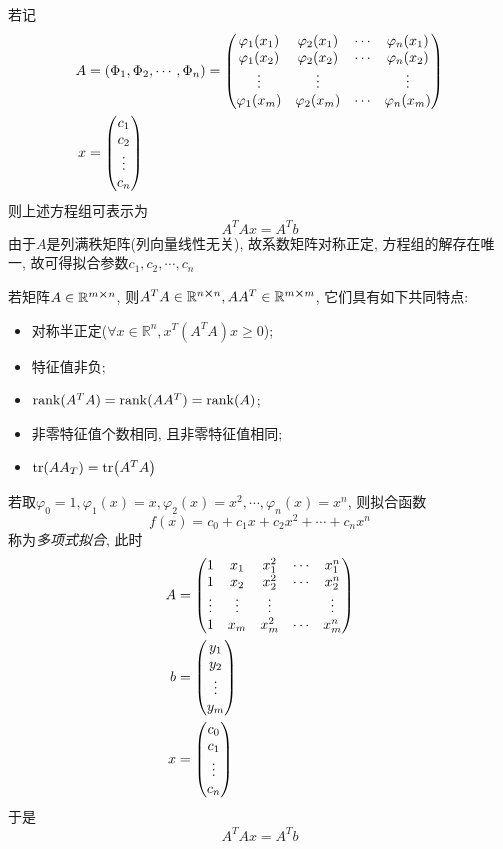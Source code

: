 若记
\begin{align*}
    A&=(\Phi_1,\Phi_2,\cdots,\Phi_n)=\mqty(
        \varphi_1(x_1)&\varphi_2(x_1)&\cdots&\varphi_n(x_1)\\
        \varphi_1(x_2)&\varphi_2(x_2)&\cdots&\varphi_n(x_2)\\
        \vdots&\vdots& &\vdots\\
        \varphi_1(x_m)&\varphi_2(x_m)&\cdots&\varphi_n(x_m)\\
    )\\
    x&=\mqty(
        c_1\\c_2\\\vdots\\c_n
    )
\end{align*}
则上述方程组可表示为
\begin{equation*}
    A^TAx=A^Tb
\end{equation*}
由于$A$是列满秩矩阵(列向量线性无关), 故系数矩阵对称正定, 方程组的解存在唯一, 故可得拟合参数$c_1,c_2,\cdots,c_n$

\begin{extend}
    若矩阵$A\in\mathbb{R}^{m\cross n}$, 则$A^TA\in\mathbb{R}^{n\cross n}, AA^T\in\mathbb{R}^{m\cross m}$, 它们具有如下共同特点:
    
    \begin{itemize}
        \item 对称半正定($\forall x\in\mathbb{R}^n, x^T(A^TA)x\ge 0$);
        \item 特征值非负;
        \item $\rank(A^TA)=\rank(AA^T)=\rank(A)$;
        \item 非零特征值个数相同, 且非零特征值相同;
        \item $\tr(AA_T)=\tr(A^TA)$
    \end{itemize}
\end{extend}

若取$\varphi_0=1,\varphi_1(x)=x,\varphi_2(x)=x^2,\cdots,\varphi_n(x)=x^n$, 则拟合函数
\begin{equation*}
    f(x)=c_0+c_1x+c_2x^2+\cdots+c_nx^n
\end{equation*}
称为\emph{多项式拟合}, 此时
\begin{align*}
    A&=\mqty(
        1&x_1&x_1^2&\cdots&x_1^n\\
        1&x_2&x_2^2&\cdots&x_2^n\\
        \vdots&\vdots&\vdots& &\vdots\\
        1&x_m&x_m^2&\cdots&x_m^n\\
    )\\
    b&=\mqty(y_1\\y_2\\\vdots\\y_m)\\
    x&=\mqty(c_0\\c_1\\\vdots\\c_n)
\end{align*}
于是
\begin{equation*}
    A^TAx=A^Tb
\end{equation*}

